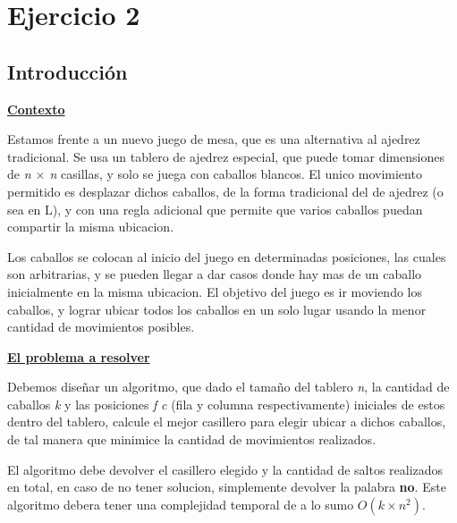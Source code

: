 \section{Ejercicio 2}
\subsection{Introducción}
\noindent \underline{\textbf{Contexto}}

Estamos frente a un nuevo juego de mesa, que es una alternativa al ajedrez tradicional. Se usa un tablero de ajedrez especial, que puede tomar dimensiones de \textit{n $\times$ n} casillas, y solo se juega con caballos blancos. El unico movimiento permitido es desplazar dichos caballos, de la forma tradicional del de ajedrez (o sea en L), y con una regla adicional que permite que varios caballos puedan compartir la misma ubicacion.

Los caballos se colocan al inicio del juego en determinadas posiciones, las cuales son arbitrarias, y se pueden llegar a dar casos donde hay mas de un caballo inicialmente en la misma ubicacion. El objetivo del juego es ir moviendo los caballos, y lograr ubicar todos los caballos en un solo lugar usando la menor cantidad de movimientos posibles.

\noindent \underline{\textbf{El problema a resolver}}

Debemos diseñar un algoritmo, que dado el tamaño del tablero \textit{n}, la cantidad de caballos \textit{k} y las posiciones \textit{f} \textit{c} (fila y columna respectivamente) iniciales de estos dentro del tablero, calcule el mejor casillero para elegir ubicar a dichos caballos, de tal manera que minimice la cantidad de movimientos realizados. 

El algoritmo debe devolver el casillero elegido y la cantidad de saltos realizados en total, en caso de no tener solucion, simplemente devolver la palabra \textbf{no}. Este algoritmo debera tener una complejidad temporal de a lo sumo \textit{$O(k \times n^2)$}.

